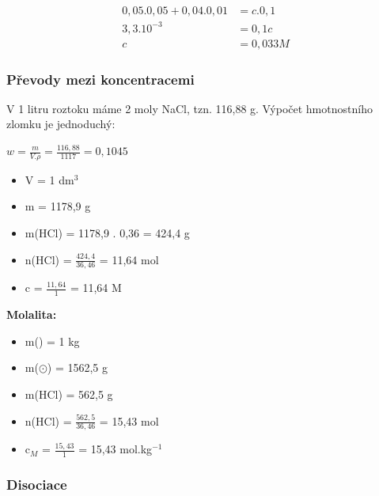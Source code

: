 \begin{align*}
	0,05 . 0,05 + 0,04 . 0,01 &= c . 0,1\\
	3,3.10^{-3} &= 0,1 c\\
	c &= 0,033 M
\end{align*}

\subsubsection{Převody mezi koncentracemi}


V 1 litru roztoku máme 2 moly NaCl, tzn. 116,88 g. Výpočet hmotnostního zlomku je jednoduchý:

$w = \frac{m}{V . \rho} = \frac{116,88}{1117} = 0,1045$


\clearpage

\begin{itemize}
	\item V = 1 dm$^3$
	\item m = 1178,9 g
	\item m(HCl) = 1178,9 . 0,36 = 424,4 g
	\item n(HCl) = $\frac{424,4}{36,46}$ = 11,64 mol
	\item c = $\frac{11,64}{1}$ = 11,64 M
\end{itemize}

\textbf{Molalita:}
\begin{itemize}
	\item m() = 1 kg
	\item m($\odot$) = 1562,5 g
	\item m(HCl) = 562,5 g
	\item n(HCl) = $\frac{562,5}{36,46}$ = 15,43 mol
	\item c$_M$ = $\frac{15,43}{1}$ = 15,43 mol.kg$^{-1}$
\end{itemize}



\subsubsection{Disociace}


